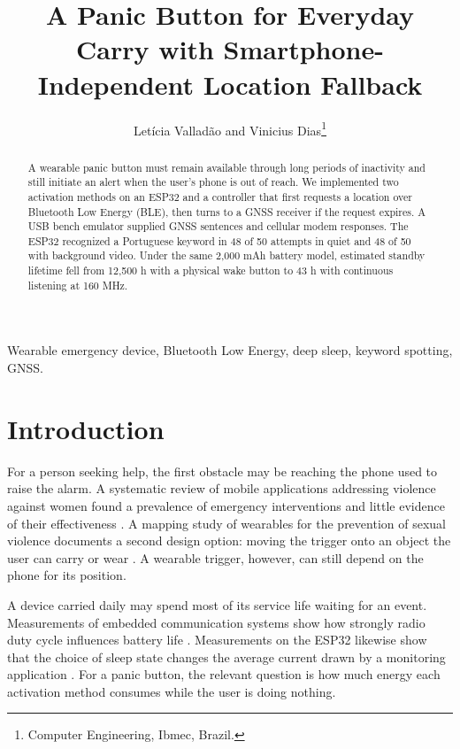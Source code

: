 \documentclass[english,hidelinks]{sbrt}
\begin{document}
\nocite{IEEEcontrol}
\title{A Panic Button for Everyday Carry with Smartphone-Independent Location Fallback}
\author{Letícia Valladão and Vinicius Dias\thanks{Computer Engineering, Ibmec, Brazil.}}
\maketitle
{}
\begin{abstract}
A wearable panic button must remain available through long periods of inactivity and still initiate an alert when the user's phone is out of reach. We implemented two activation methods on an ESP32 and a controller that first requests a location over Bluetooth Low Energy (BLE), then turns to a GNSS receiver if the request expires. A USB bench emulator supplied GNSS sentences and cellular modem responses. The ESP32 recognized a Portuguese keyword in 48 of 50 attempts in quiet and 48 of 50 with background video. Under the same 2{,}000 mAh battery model, estimated standby lifetime fell from 12{,}500 h with a physical wake button to 43 h with continuous listening at 160 MHz.
\end{abstract}
\begin{keywords}
Wearable emergency device, Bluetooth Low Energy, deep sleep, keyword spotting, GNSS.
\end{keywords}
\section{Introduction}
For a person seeking help, the first obstacle may be reaching the phone used to raise the alarm. A systematic review of mobile applications addressing violence against women found a prevalence of emergency interventions and little evidence of their effectiveness \cite{eisenhut}. A mapping study of wearables for the prevention of sexual violence documents a second design option: moving the trigger onto an object the user can carry or wear \cite{paiva}. A wearable trigger, however, can still depend on the phone for its position.

A device carried daily may spend most of its service life waiting for an event. Measurements of embedded communication systems show how strongly radio duty cycle influences battery life \cite{caracas2011energy}. Measurements on the ESP32 likewise show that the choice of sleep state changes the average current drawn by a monitoring application \cite{dzahir2023evaluating}. For a panic button, the relevant question is how much energy each activation method consumes while the user is doing nothing.
\end{document}
